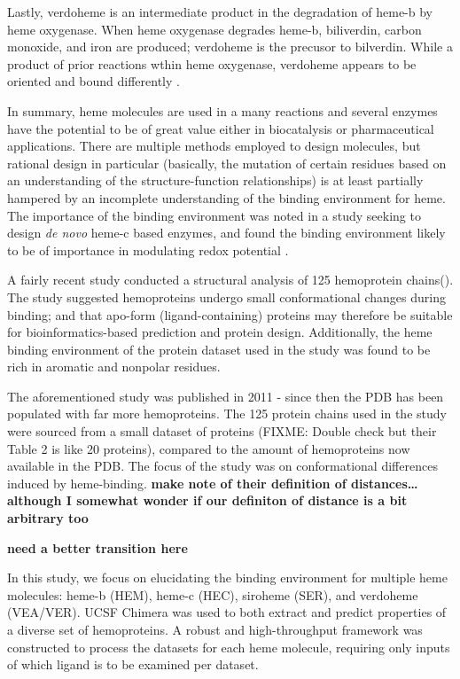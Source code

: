 \documentclass[a4paper, nobind]{templates/ociamthesis}
\begin{document}
Lastly, verdoheme is an intermediate product in the degradation of heme-b by heme oxygenase. When heme oxygenase degrades heme-b, biliverdin, carbon monoxide, and iron are produced; verdoheme is the precusor to bilverdin\autocite{Lai2010,Sato2007}. While a product of prior reactions wthin heme oxygenase, verdoheme appears to be oriented and bound differently \autocite{Lad2004}.

In summary, heme molecules are used in a many reactions and several enzymes have the potential to be of great value either in biocatalysis or pharmaceutical applications. There are multiple methods employed to design molecules, but rational design in particular (basically, the mutation of certain residues based on an understanding of the structure-function relationships) is at least partially hampered by an incomplete understanding of the binding environment for heme. The importance of the binding environment was noted in a study seeking to design \emph{de novo} heme-c based enzymes, and found the binding environment likely to be of importance in modulating redox potential \autocite{Ishida2004}.

A fairly recent study conducted a structural analysis of 125 hemoprotein chains(\textcite{Li2011}). The study suggested hemoproteins undergo small conformational changes during binding; and that apo-form (ligand-containing) proteins may therefore be suitable for bioinformatics-based prediction and protein design. Additionally, the heme binding environment of the protein dataset used in the study was found to be rich in aromatic and nonpolar residues.

The aforementioned study was published in 2011 - since then the PDB has been populated with far more hemoproteins. The 125 protein chains used in the study were sourced from a small dataset of proteins (FIXME: Double check but their Table 2 is like 20 proteins), compared to the amount of hemoproteins now available in the PDB. The focus of the study was on conformational differences induced by heme-binding. \textbf{make note of their definition of distances\ldots{} although I somewhat wonder if our definiton of distance is a bit arbitrary too}

\textbf{need a better transition here}

In this study, we focus on elucidating the binding environment for multiple heme molecules: heme-b (HEM), heme-c (HEC), siroheme (SER), and verdoheme (VEA/VER). UCSF Chimera was used to both extract and predict properties of a diverse set of hemoproteins. A robust and high-throughput framework was constructed to process the datasets for each heme molecule, requiring only inputs of which ligand is to be examined per dataset.
\end{document}
